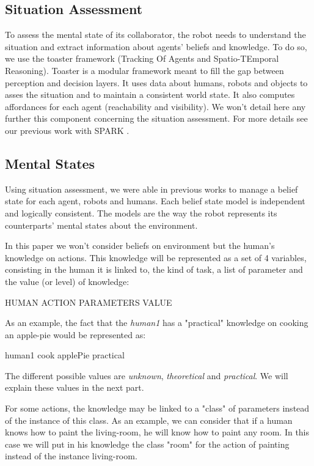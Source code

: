 \documentclass{llncs}
\begin{document}
\subsection{Situation Assessment}
To assess the mental state of its collaborator, the robot needs to understand the situation and extract information about agents' beliefs and knowledge.
To do so, we use the toaster framework (Tracking Of Agents and Spatio-TEmporal Reasoning). Toaster is a modular framework meant to fill the gap between perception and decision layers. It uses data about humans, robots and objects to asses the situation and to maintain a consistent world state. It also computes affordances for each agent (reachability and visibility).
We won't detail here any further this component concerning the situation assessment.
For more details see our previous work with SPARK \cite{Milliez2014}.

\subsection{Mental States}
Using situation assessment, we were able in previous works to manage a belief state for each agent, robots and humans. Each belief state model is independent and logically consistent. The models are the way the robot represents its counterparts' mental states about the environment.

In this paper we won't consider beliefs on environment but the human's knowledge on actions. This knowledge will be represented as a set of 4 variables, consisting in the human it is linked to, the kind of task, a list of parameter and the value (or level) of knowledge:

HUMAN ACTION PARAMETERS VALUE

As an example, the fact that the \textit{human1} has a "practical" knowledge on cooking an apple-pie would be represented as:

human1 cook applePie practical

The different possible values are \textit{unknown}, \textit{theoretical} and \textit{practical}. We will explain these values in the next part.

For some actions, the knowledge may be linked to a "class" of parameters instead of the instance of this class.
As an example, we can consider that if a human knows how to paint the living-room, he will know how to paint any room. In this case we will put in his knowledge the class "room" for the action of painting instead of the instance living-room.
\end{document}
